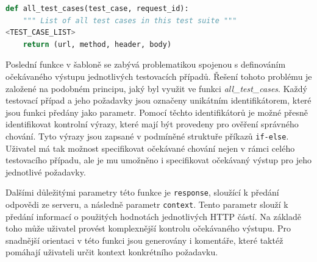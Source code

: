 
\begin{lstlisting}[language=Python, frame=single]
def all_test_cases(test_case, request_id):
    """ List of all test cases in this test suite """
<TEST_CASE_LIST>
    return (url, method, header, body)
\end{lstlisting}

Poslední funkce v šabloně se zabývá problematikou spojenou s definováním očekávaného výstupu jednotlivých testovacích případů. Řešení tohoto problému je založené na podobném principu, jaký byl využit ve funkci \textit{all\_test\_cases}. Každý testovací případ a jeho požadavky jsou označeny unikátním identifikátorem, které jsou funkci předány jako parametr. Pomocí těchto identifikátorů je možné přesně identifikovat kontrolní výrazy, které mají být provedeny pro ověření správného chování. Tyto výrazy jsou zapsané v podmíněné struktuře příkazů \texttt{if-else}. Uživatel má tak možnost specifikovat očekávané chování nejen v rámci celého testovacího případu, ale je mu umožněno i specifikovat očekávaný výstup pro jeho jednotlivé požadavky.

Dalšími důležitými parametry této funkce je \texttt{response}, sloužící k předání odpovědi ze serveru, a následně parametr \texttt{context}. Tento parametr slouží k předání informací o použitých hodnotách jednotlivých HTTP částí. Na základě toho může uživatel provést komplexnější kontrolu očekávaného výstupu. Pro snadnější orientaci v této funkci jsou generovány i komentáře, které taktéž pomáhají uživateli určit kontext konkrétního požadavku. 




